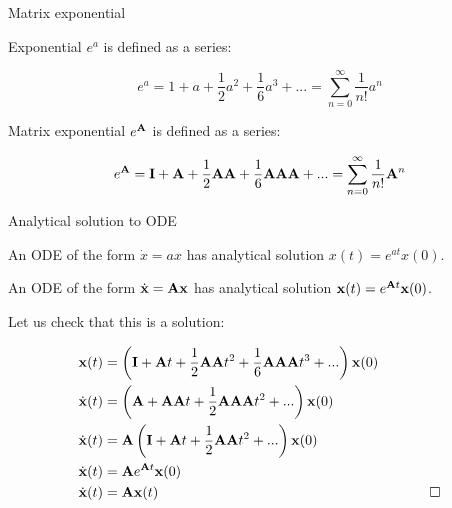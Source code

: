 \documentclass{beamer}
\begin{document}
\begin{frame}
	
	
\end{frame}





\begin{frame}{Matrix exponential}
	\begin{flushleft}
		
		Exponential $e^a$ is defined as a series:
		
		\begin{equation}
			e^a =1+a+\frac{1}{2} a^2
			+\frac{1}{6} a^3 + ... = \sum_{n=0}^{\infty} \frac{1}{n!} a^n
		\end{equation}
		
		Matrix exponential $e^{\mathbf{A}}$ is defined as a series:
		
		\begin{equation}
			e^{\mathbf{A}} = \mathbf{I}+\mathbf{A}+\frac{1}{2} \mathbf{A}\mathbf{A}
			+\frac{1}{6} \mathbf{A}\mathbf{A}\mathbf{A} + ... = \sum_{n=0}^{\infty} \frac{1}{n!} \mathbf{A}^n
		\end{equation}
		
		
	\end{flushleft}
\end{frame}




\begin{frame}{Analytical solution to ODE}
	\begin{flushleft}
		
		An ODE of the form $\dot x = a x$ has analytical solution $x(t) = e^{at} x(0)$.
		
		\bigskip
		
		An ODE of the form $\dot{\mathbf{x}} = \mathbf{A}  \mathbf{x}$ has analytical solution $\mathbf{x}(t) = e^{\mathbf{A}t}  \mathbf{x}(0)$.
		
		\bigskip
		
		Let us check that this is a solution:
		
		\begin{align}
			\mathbf{x}(t) &= \left( \mathbf{I}+\mathbf{A}t+\frac{1}{2} \mathbf{A}\mathbf{A}t^2
			+\frac{1}{6} \mathbf{A}\mathbf{A}\mathbf{A}t^3 + ... \right)  \mathbf{x}(0) &
			\\
			\dot{\mathbf{x}}(t) &= \left( \mathbf{A}+\mathbf{A}\mathbf{A}t
			+\frac{1}{2}\mathbf{A}\mathbf{A}\mathbf{A}t^2 + ... \right)  \mathbf{x}(0) 	&		
			\\
			\dot{\mathbf{x}}(t) &= \mathbf{A} \left(\mathbf{I} +\mathbf{A}t
			+\frac{1}{2}\mathbf{A}\mathbf{A}t^2 + ... \right)  \mathbf{x}(0) 	&		
			\\
			\dot{\mathbf{x}}(t) &= \mathbf{A} e^{\mathbf{A}t}  \mathbf{x}(0) 	&		 			
			\\
			\dot{\mathbf{x}}(t) &= \mathbf{A} \mathbf{x}(t)  &\ \ \qed
		\end{align}
		
		
		
	\end{flushleft}
\end{frame}
\end{document}
